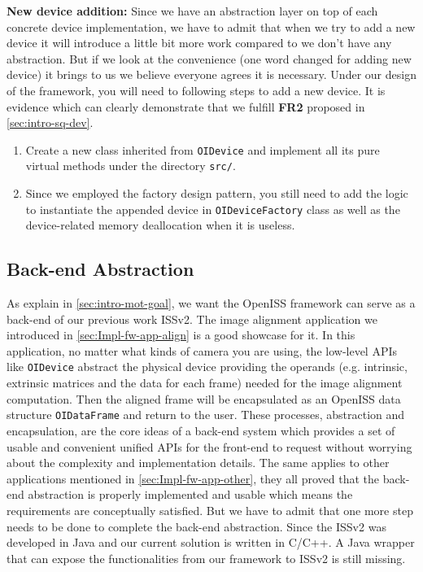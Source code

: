 \textbf{New device addition:} Since we have an abstraction layer on top of each
concrete device implementation, we have to admit that when we try to add a new
device it will introduce a little bit more work compared to we don't have any
abstraction. But if we look at the convenience (one word changed for adding new
device) it brings to us we believe everyone agrees it is necessary. Under our
design of the framework, you will need to following steps to add a new device.
It is evidence which can clearly demonstrate that we fulfill
\textbf{FR2} proposed in \autoref{sec:intro-sq-dev}.

\begin{enumerate}
    \item Create a new class inherited from \texttt{OIDevice} and implement all
    its pure virtual methods under the directory \texttt{src/}.

    \item Since we employed the factory design pattern, you still need to add
    the logic to instantiate the appended device in \texttt{OIDeviceFactory}
    class as well as the device-related memory deallocation when it is useless.
\end{enumerate}

\subsection{Back-end Abstraction}
\label{sec:Eval-framework-backend}

As explain in \autoref{sec:intro-mot-goal}, we want the OpenISS framework can
serve
as a back-end of our previous work ISSv2. The image alignment application we
introduced in \autoref{sec:Impl-fw-app-align} is a good showcase for it. In this
application,  no matter what kinds of camera you are using,
the low-level APIs like \texttt{OIDevice} abstract the physical
device providing the operands (e.g. intrinsic, extrinsic matrices and the data
for each frame) needed for the image alignment computation. Then the aligned
frame will be encapsulated as an OpenISS data structure \texttt{OIDataFrame}
and return to the user.
These processes, abstraction and encapsulation, are the core ideas of a
back-end system which provides a set of usable and convenient unified APIs for
the front-end to request without worrying about the complexity and
implementation details. The same applies to other applications mentioned in
\autoref{sec:Impl-fw-app-other}, they all proved that the back-end abstraction
is properly implemented and usable which means the requirements are
conceptually satisfied.
But we have to admit that one more step needs to be done to
complete the back-end abstraction. Since the ISSv2 was developed in Java and
our current solution is written in C/C++. A Java wrapper that can expose the
functionalities from our framework to ISSv2 is still missing.

